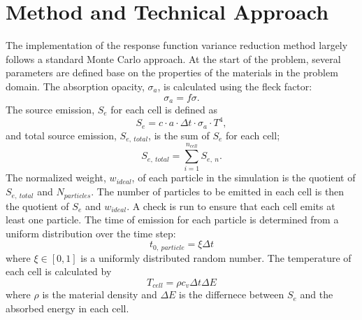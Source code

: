 \documentclass[]{article}
\begin{document}
\section{Method and Technical Approach}
	The implementation of the response function variance reduction method largely follows a standard Monte Carlo approach. At the start of the problem, several parameters are defined base on the properties of the materials in the problem domain. The absorption opacity, $\sigma_{a}$, is calculated using the fleck factor:
	\begin{equation}
	\sigma_{a} = f \sigma.
	\end{equation}The source emission, $S_{e}$ for each cell is defined as 
	\begin{equation}
		S_{e} = c \cdot a \cdot \Delta t \cdot \sigma_{a}  \cdot T^{4},
	\end{equation}
	and total source emission, $S_{e,~total}$, is the sum of $S_{e}$ for each cell;
	\begin{equation}
		S_{e,~total} = \sum_{i = 1}^{n_{cell}} S_{e,~n}.
	\end{equation}
	The normalized weight, $w_{ideal}$, of each particle in the simulation is the quotient of $S_{e,~total}$ and $N_{particles}$. The number of particles to be emitted in each cell is then the quotient of $S_{e}$ and $w_{ideal}$. A check is run to ensure that each cell emits at least one particle. The time of emission for each particle is determined from a uniform distribution over the time step:
	\begin{equation}
		t_{0,~particle} = \xi \Delta t
	\end{equation}
	where $\xi \in [0,1]$ is a uniformly distributed random number. The temperature of each cell is calculated by
	\begin{equation} \label{Eq: cell_T}
		T_{cell} = \rho c_{v} \Delta t \Delta E
	\end{equation}
	where $\rho$ is the material density and $\Delta E$ is the differnece between $S_{e}$ and the absorbed energy in each cell.
\end{document}
